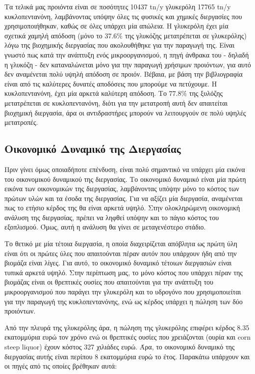 \documentclass[11pt]{article}
\begin{document}
Τα τελικά μας προιόντα είναι σε ποσότητες 10437 tn/y γλυκερόλη 17765 tn/y κυκλοπεντανόνη, λαμβάνοντας υπόψην όλες τις φυσικές και χημικές διεργασίες που χρησιμοποιήθηκαν, καθώς σε όλες υπάρχει μία απώλεια. Η γλυκερόλη έχει μία σχετικά χαμηλή απόδοση (μόνο το \(37.6 \%\) της γλυκόζης μετατρέπεται σε γλυκερόλης) λόγω της βιοχημικής διεργασίας που ακολουθήθηκε για την παραγωγή της. Είναι γνωστό πως κατά την ανάπτυξη ενός μικροοργανισμού, η πηγή άνθρακα του - δηλαδή η γλυκόζη - δεν καταναλώνεται μόνο για την παραγωγή χρήσιμων προιόντων, για αυτό δεν αναμένεται πολύ υψηλή απόδοση σε προιόν. Βέβαια, με βάση την βιβλιογραφία είναι από τις καλύτερες δυνατές αποδόσεις που μπορούμε να πετύχουμε. Η κυκλοπεντανόνη, έχει μία αρκετά καλύτερη απόδοση. Το \(77.8 \%\) της ξυλόζης μετατρέπεται σε κυκλοπεντανόνη, διότι για την μετατροπή αυτή δεν απαιτείται βιοχημική διεργασία, άρα οι αντιδραστήρες μπορούν να λειτουργούν σε πολύ υψηλές μετατροπές.

\subsection{Οικονομικό Δυναμικό της Διεργασίας}
\label{sec:org4a33da0}
Πριν γίνει όμως οποιαδήποτε επένδυση, είναι πολύ σημαντικό να υπάρχει μία εικόνα του οικονομικού δυναμικού της διεργασίας. Το οικονομικό δυναμικό είναι μία πρώτη εικόνα των οικονομικών της διεργασίας, λαμβάνοντας υπόψην μόνο το κόστος των πρώτων υλών και τα έσοδα της διεργασίας. Για να αξίζει μία διεργασία, αναμένεται πως το ετήσιο κέρδος της θα είναι αρκετά υψηλό. Στην ολοκληρώμενη οικονομική ανάλυση της διεργασίας, πρέπει να ληφθεί υπόψην και το πάγιο κόστος του εξοπλισμού. Όμως, αυτή η ανάλυση θα γίνει σε μεταγενέστερο στάδιο.

Το θετικό με μία τέτοια διεργασία, η οποία διαχειρίζεται απόβλητα ως πρώτη ύλη είναι ότι οι πρώτες ύλες που απαιτούνται πέραν αυτόν που υπάρχουν ήδη από την βιομάζα είναι λίγες. Για αυτό, το οικονομικό δυναμικό τέτοιων διεργασιών είναι τυπικά αρκετά υψηλό. Στην περίπτωση μας, το μόνο κόστος που υπάρχει πέραν της βιομάζας είναι οι θρεπτικές ουσίες που απαιτούνται για την ανάπτυξη του μικροοργανισμού που παράγει την γλυκερόλη και το υδρογόνο που χρησιμοποιείται για την παραγωγή της κυκλοπεντανόνης, ενώ ως κέρδος υπάρχει η πώληση των δύο προιόντων.

Από την πλευρά της γλυκερόλης άρα, η πώληση της γλυκερόλης επιφέρει κέρδος 8.35 εκατομμύρια ευρώ τον χρόνο ενώ οι θρεπτικές ουσίες που χρειάζονται (ουρία και corn steep liquor) έχουν κόστος 327 χιλιάδες ευρώ. Άρα, το οικονομικό δυναμικό της διεργασίας αυτής είναι περίπου 8 εκατομμύρια ευρώ το έτος. Παρακάτω υπάρχουν και οι πηγές από τις οποίες βρέθηκαν αυτά:
\end{document}
